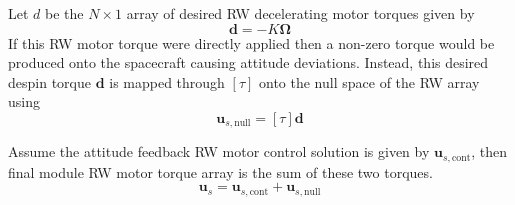 Let $ d$ be the $N\times 1$ array of desired RW decelerating motor torques given by
\begin{equation}
	\bm d = -K \bm\Omega
\end{equation}
If this RW motor torque were directly applied then a non-zero torque would be produced onto the spacecraft causing attitude deviations.  Instead, this desired despin torque $\bm d$ is mapped through $[\tau]$ onto the null space of the RW array using
\begin{equation}
	\bm u_{s,\text{null}} = [\tau] \bm d
\end{equation}

Assume the attitude feedback RW motor control solution is given by $\bm u_{s,\text{cont}}$, then final module RW motor torque array is the sum of these two torques.
\begin{equation}
	\bm u_{s} = \bm u_{s,\text{cont}} + \bm u_{s,\text{null}} 
\end{equation}




